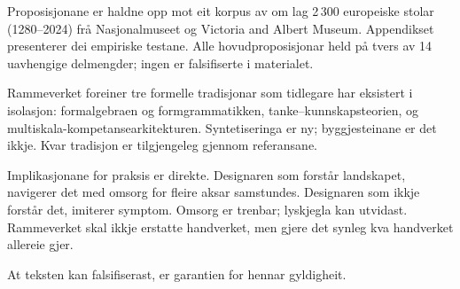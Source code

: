 \backmatter
{}
\begin{widebody}
Proposisjonane er haldne opp mot eit korpus av om lag 2\,300 europeiske stolar (1280--2024) frå Nasjonalmuseet og Victoria and Albert Museum. Appendikset presenterer dei empiriske testane. Alle hovudproposisjonar held på tvers av 14 uavhengige delmengder; ingen er falsifiserte i materialet.

Rammeverket foreiner tre formelle tradisjonar som tidlegare har eksistert i isolasjon: formalgebraen og formgrammatikken, tanke--kunnskapsteorien, og multiskala-kompetansearkitekturen. Syntetiseringa er ny; byggjesteinane er det ikkje. Kvar tradisjon er tilgjengeleg gjennom referansane.

Implikasjonane for praksis er direkte. Designaren som forstår landskapet, navigerer det med omsorg for fleire aksar samstundes. Designaren som ikkje forstår det, imiterer symptom. Omsorg er trenbar; lyskjegla kan utvidast. Rammeverket skal ikkje erstatte handverket, men gjere det synleg kva handverket allereie gjer.

At teksten kan falsifiserast, er garantien for hennar gyldigheit.

\end{widebody}
